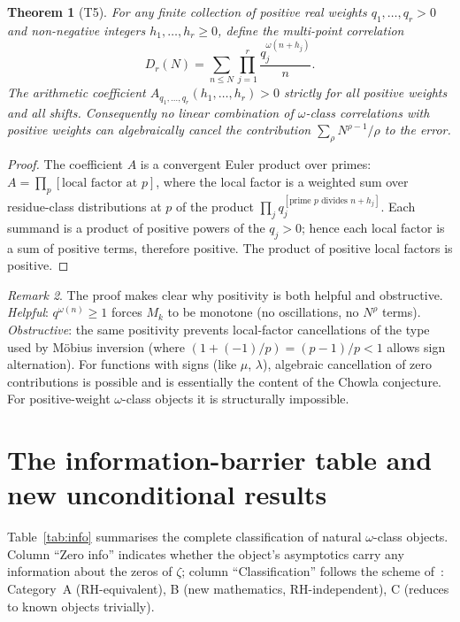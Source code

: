 \documentclass[11pt]{amsart}
\newtheorem{theorem}{Theorem}[section]
\theoremstyle{definition}
\theoremstyle{remark}
\newtheorem{remark}[theorem]{Remark}
\newcommand{\om}{\omega}
\begin{document}
\begin{theorem}[T5]\label{thm:impossible}
  For any finite collection of positive real weights $q_1,\ldots,q_r>0$ and
  non-negative integers $h_1,\ldots,h_r\ge 0$, define the multi-point correlation
  \[
    D_r(N) = \sum_{n\le N}\prod_{j=1}^r \frac{q_j^{\om(n+h_j)}}{n}.
  \]
  The arithmetic coefficient $A_{q_1,\ldots,q_r}(h_1,\ldots,h_r)>0$ strictly
  for all positive weights and all shifts.  Consequently no linear combination of
  $\om$-class correlations with positive weights can algebraically cancel the
  contribution $\sum_\rho N^{\rho-1}/\rho$ to the error.
\end{theorem}
\begin{proof}
  The coefficient $A$ is a convergent Euler product over primes:
  $A = \prod_p [\text{local factor at } p]$, where the local factor is
  a weighted sum over residue-class distributions at $p$ of the
  product $\prod_j q_j^{[\text{prime } p\text{ divides }n+h_j]}$.
  Each summand is a product of positive powers of the $q_j > 0$;
  hence each local factor is a sum of positive terms, therefore positive.
  The product of positive local factors is positive.
\end{proof}

\begin{remark}
  The proof makes clear why positivity is both helpful and obstructive.
  \emph{Helpful}: $q^{\om(n)}\ge 1$ forces $M_k$ to be monotone (no oscillations,
  no $N^\rho$ terms).
  \emph{Obstructive}: the same positivity prevents local-factor cancellations
  of the type used by M\"obius inversion (where $(1+(-1)/p)=(p-1)/p<1$ allows
  sign alternation).
  For functions with signs (like $\mu$, $\lambda$), algebraic cancellation of
  zero contributions is possible and is essentially the content of the Chowla conjecture.
  For positive-weight $\om$-class objects it is structurally impossible.
\end{remark}

\section{The information-barrier table and new unconditional results}
\label{sec:table}

Table~\ref{tab:info} summarises the complete classification of natural $\om$-class
objects.  Column ``Zero info'' indicates whether the object's asymptotics carry any
information about the zeros of $\zeta$; column ``Classification'' follows the scheme
of~\cite{RP1}: Category~A (RH-equivalent), B (new mathematics, RH-independent),
C (reduces to known objects trivially).
\end{document}
